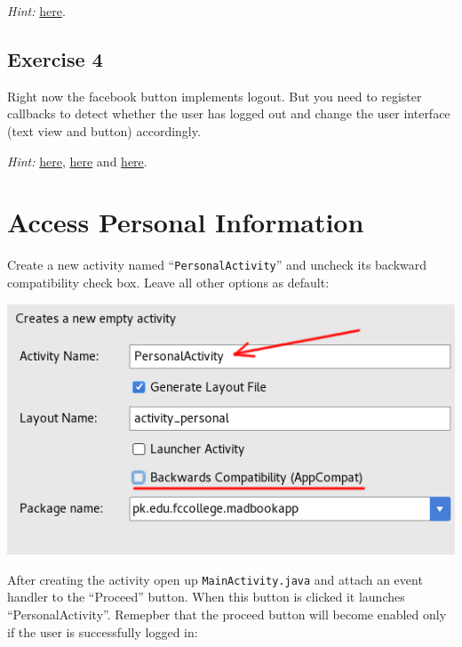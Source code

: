 \textit{Hint:} \href{http://stackoverflow.com/questions/29294015/how-to-check-if-user-is-logged-in-with-fb-sdk-4-0-for-android}{here}.

\subsection{Exercise 4}
\label{FBI:exercise4}
Right now the facebook button implements logout. But you need to register callbacks to detect whether the user has logged out and change the user interface (text view and button) accordingly.

\textit{Hint:} \href{http://stackoverflow.com/questions/29305232/facebook-sdk-4-for-android-how-to-log-out-programmatically}{here}, \href{http://stackoverflow.com/questions/30360068/how-to-detect-logout-event-with-the-facebook-android-api-v4}{here} and \href{http://stackoverflow.com/questions/29294015/how-to-check-if-user-is-logged-in-with-fb-sdk-4-0-for-android}{here}.

\section{Access Personal Information}
\label{FBI:accessPersonalInformation}

Create a new activity named ``\texttt{PersonalActivity}'' and uncheck its backward compatibility check box. Leave all other options as default:

\begin{center}
	\includegraphics[scale=\SourceCodeScale]{chapters/ch12/images/28}
\end{center}

After creating the activity open up \texttt{MainActivity.java} and attach an event handler to the ``Proceed'' button. When this button is clicked it launches ``PersonalActivity''. Remepber that the proceed button will become enabled only if the user is successfully logged in:

